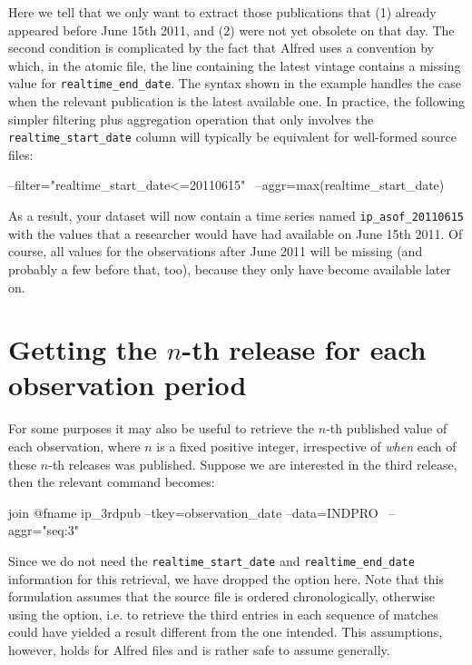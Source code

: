 \begin{itemize}
  Here we tell  that we only want to extract those
  publications that (1) already appeared before June 15th 2011, and
  (2) were not yet obsolete on that day. The second condition is
  complicated by the fact that Alfred uses a convention by which, in
  the atomic file, the line containing the latest vintage contains a
  missing value for \texttt{realtime\_end\_date}. The syntax shown in
  the example handles the case when the relevant publication is the
  latest available one. In practice, the following simpler filtering
  plus aggregation operation that only involves the
  \verb|realtime_start_date| column will typically be equivalent for
  well-formed source files: 
\end{itemize}
\begin{code}
  --filter="realtime_start_date<=20110615" \
  --aggr=max(realtime_start_date)
\end{code}
As a result, your dataset will now contain a time series named
\verb|ip_asof_20110615| with the values that a researcher would have
had available on June 15th 2011. Of course, all values for the
observations after June 2011 will be missing (and probably a few
before that, too), because they only have become available later on.

\section{Getting the $n$-th release for each observation period}

For some purposes it may also be useful to retrieve the $n$-th published
value of each observation, where $n$ is a fixed positive integer,
irrespective of \emph{when} each of these $n$-th releases was
published. Suppose we are interested in the third release, then the
relevant \cmd{join} command becomes:
\begin{code}
  join @fname ip_3rdpub --tkey=observation_date --data=INDPRO \
    --aggr="seq:3"
\end{code}
Since we do not need the \verb|realtime_start_date| and
\verb|realtime_end_date| information for this retrieval, we have
dropped the \option{timecols} option here. Note that this formulation
assumes that the source file is ordered chronologically, otherwise
using the \option{aggr="seq:3"} option, i.e. to retrieve the third
entries in each sequence of matches could have yielded a result
different from the one intended. This assumptions, however, holds for
Alfred files and is rather safe to assume generally.

